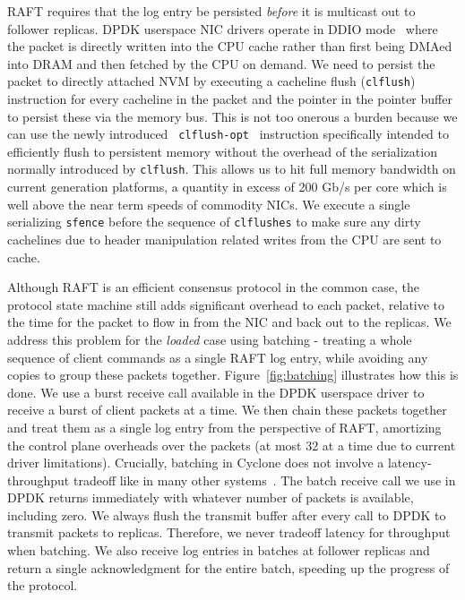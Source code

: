 \documentclass[twocolumn]{article}
\begin{document}
RAFT requires that the log entry be persisted \emph{before} it is multicast out
to follower replicas. DPDK userspace NIC drivers operate in DDIO
mode~\cite{ddio} where the packet is directly written into the CPU cache rather
than first being DMAed into DRAM and then fetched by the CPU on demand. We need
to persist the packet to directly attached NVM by executing a cacheline flush
({\tt clflush}) instruction for every cacheline in the packet and the pointer in
the pointer buffer to persist these via the memory bus. This is not too onerous
a burden because we can use the newly introduced {\tt
  clflush-opt}~\cite{clflush_opt} instruction specifically intended to
efficiently flush to persistent memory without the overhead of the serialization
normally introduced by {\tt clflush}. This allows us to hit full memory
bandwidth on current generation platforms, a quantity in excess of 200 Gb/s per
core which is well above the near term speeds of commodity NICs. We execute a
single serializing {\tt sfence} before the sequence of {\tt clflushes} to make
sure any dirty cachelines due to header manipulation related writes from the CPU
are sent to cache.

Although RAFT is an efficient consensus protocol in the common case, the
protocol state machine still adds significant overhead to each packet, relative
to the time for the packet to flow in from the NIC and back out to the replicas.
We address this problem for the \emph{loaded} case using batching - treating a
whole sequence of client commands as a single RAFT log entry, while avoiding any
copies to group these packets together. Figure~\ref{fig:batching} illustrates
how this is done. We use a burst receive call available in the DPDK userspace
driver to receive a burst of client packets at a time. We then chain these
packets together and treat them as a single log entry from the perspective of
RAFT, amortizing the control plane overheads over the packets (at most 32 at a
time due to current driver limitations). Crucially, batching in Cyclone does not
involve a latency-throughput tradeoff like in many other
systems~\cite{ix-dataplane}. The batch receive call we use in DPDK returns
immediately with whatever number of packets is available, including zero. We
always flush the transmit buffer after every call to DPDK to transmit packets to
replicas. Therefore, we never tradeoff latency for throughput when batching. We
also receive log entries in batches at follower replicas and return a single
acknowledgment for the entire batch, speeding up the progress of the protocol.
\end{document}
